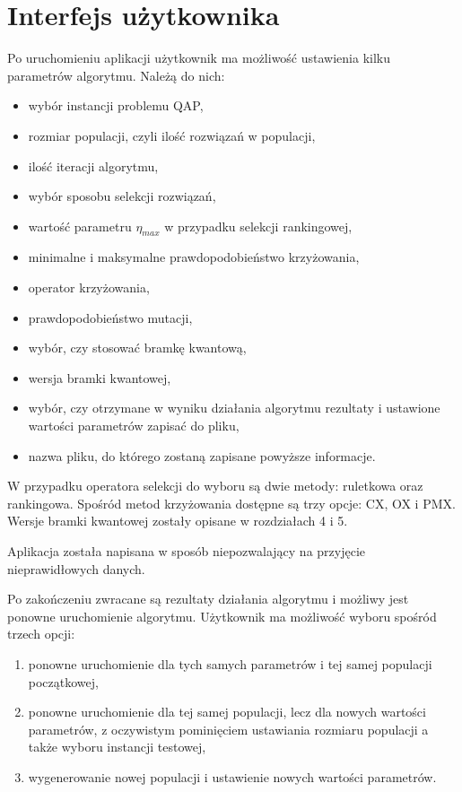 \section{Interfejs użytkownika}
Po uruchomieniu aplikacji użytkownik ma możliwość ustawienia kilku parametrów algorytmu. Należą do nich:
\begin{itemize}
\item wybór instancji problemu QAP,
\item rozmiar populacji, czyli ilość rozwiązań w populacji,
\item ilość iteracji algorytmu,
\item wybór sposobu selekcji rozwiązań,
\item wartość parametru $\eta_{max}$ w przypadku selekcji rankingowej,
\item minimalne i maksymalne prawdopodobieństwo krzyżowania,
\item operator krzyżowania,
\item prawdopodobieństwo mutacji,
\item wybór, czy stosować bramkę kwantową,
\item wersja bramki kwantowej,
\item wybór, czy otrzymane w wyniku działania algorytmu rezultaty i ustawione wartości parametrów zapisać do pliku,
\item nazwa pliku, do którego zostaną zapisane powyższe informacje.
\end{itemize}

W przypadku operatora selekcji do wyboru są dwie metody: ruletkowa oraz rankingowa. Spośród metod krzyżowania dostępne są trzy opcje: CX, OX i PMX. Wersje bramki kwantowej zostały opisane w rozdziałach 4 i 5.

Aplikacja została napisana w sposób niepozwalający na przyjęcie nieprawidłowych danych.

Po zakończeniu zwracane są rezultaty działania algorytmu i możliwy jest ponowne uruchomienie algorytmu. Użytkownik ma możliwość wyboru spośród trzech opcji:
\begin{enumerate}
\item ponowne uruchomienie dla tych samych parametrów i tej samej populacji początkowej,
\item ponowne uruchomienie dla tej samej populacji, lecz dla nowych wartości parametrów, z oczywistym pominięciem ustawiania rozmiaru populacji a także wyboru instancji testowej,
\item wygenerowanie nowej populacji i ustawienie nowych wartości parametrów.
\end{enumerate}

